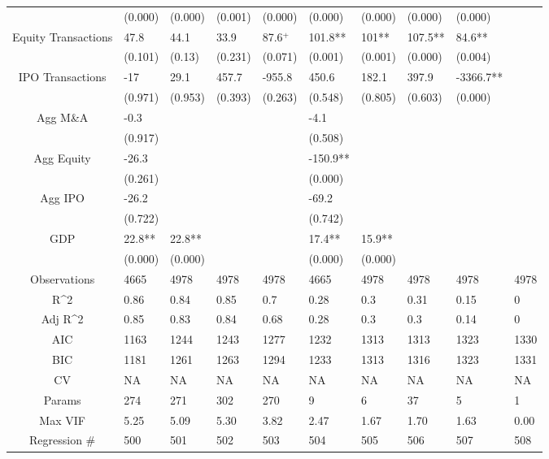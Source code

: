 \documentclass{article}
\begin{document}
\begin{table}[H]
\begin{tabular}{|clllllllll|}
   & (0.000) & (0.000) & (0.001) & (0.000) & (0.000) & (0.000) & (0.000) & (0.000) &  \\
  Equity Transactions & 47.8 & 44.1 & 33.9 & 87.6$^{+}$ & 101.8** & 101** & 107.5** & 84.6** &  \\
   & (0.101) & (0.13) & (0.231) & (0.071) & (0.001) & (0.001) & (0.000) & (0.004) &  \\
  IPO Transactions & -17 & 29.1 & 457.7 & -955.8 & 450.6 & 182.1 & 397.9 & -3366.7** &  \\
   & (0.971) & (0.953) & (0.393) & (0.263) & (0.548) & (0.805) & (0.603) & (0.000) &  \\
  Agg M\&A & -0.3 &  &  &  & -4.1 &  &  &  &  \\
   & (0.917) &  &  &  & (0.508) &  &  &  &  \\
  Agg Equity & -26.3 &  &  &  & -150.9** &  &  &  &  \\
   & (0.261) &  &  &  & (0.000) &  &  &  &  \\
  Agg IPO & -26.2 &  &  &  & -69.2 &  &  &  &  \\
   & (0.722) &  &  &  & (0.742) &  &  &  &  \\
  GDP & 22.8** & 22.8** &  &  & 17.4** & 15.9** &  &  &  \\
   & (0.000) & (0.000) &  &  & (0.000) & (0.000) &  &  &  \\
  \hline
 Observations & 4665 & 4978 & 4978 & 4978 & 4665 & 4978 & 4978 & 4978 & 4978 \\
  R^2 & 0.86 & 0.84 & 0.85 & 0.7 & 0.28 & 0.3 & 0.31 & 0.15 & 0 \\
  Adj R^2 & 0.85 & 0.83 & 0.84 & 0.68 & 0.28 & 0.3 & 0.3 & 0.14 & 0 \\
  AIC & 1163 & 1244 & 1243 & 1277 & 1232 & 1313 & 1313 & 1323 & 1330 \\
  BIC & 1181 & 1261 & 1263 & 1294 & 1233 & 1313 & 1316 & 1323 & 1331 \\
  CV & NA & NA & NA & NA & NA & NA & NA & NA & NA \\
  Params & 274 & 271 & 302 & 270 & 9 & 6 & 37 & 5 & 1 \\
  Max VIF & 5.25 & 5.09 & 5.30 & 3.82 & 2.47 & 1.67 & 1.70 & 1.63 & 0.00 \\
  Regression \# & 500 & 501 & 502 & 503 & 504 & 505 & 506 & 507 & 508 \\
   \hline
\end{tabular}

\end{table}
\end{document}
